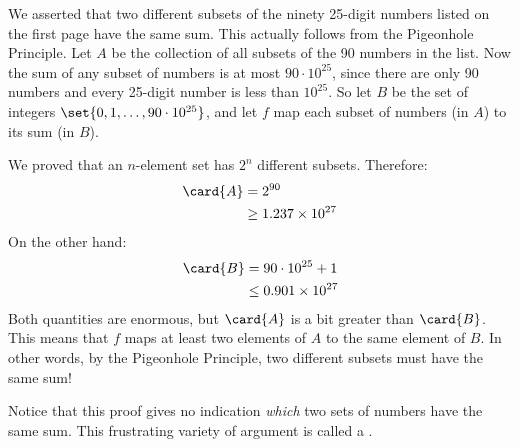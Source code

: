We asserted that two different subsets of the ninety 25-digit numbers
listed on the first page have the same sum.  This actually follows
from the Pigeonhole Principle.  Let $A$ be the collection of all
subsets of the 90 numbers in the list.  Now the sum of any subset of
numbers is at most $90 \cdot 10^{25}$, since there are only 90 numbers
and every 25-digit number is less than $10^{25}$.  So let $B$ be the
set of integers $\set{0, 1, \ldots, 90 \cdot 10^{25}}$, and let $f$
map each subset of numbers (in $A$) to its sum (in $B$).

We proved that an $n$-element set has $2^n$ different subsets.
Therefore:
%
\begin{align*}
\card{A}
    & = 2^{90} \\
    & \geq 1.237 \times 10^{27}
\end{align*}
%
On the other hand:
%
\begin{align*}
\card{B}
    & = 90 \cdot 10^{25} + 1 \\
    & \leq 0.901 \times 10^{27}
\end{align*}
%
Both quantities are enormous, but $\card{A}$ is a bit greater than
$\card{B}$.  This means that $f$ maps at least two elements of $A$ to
the same element of $B$.  In other words, by the Pigeonhole Principle,
two different subsets must have the same sum!

Notice that this proof gives no indication \emph{which} two sets of
numbers have the same sum.  This frustrating variety of argument is
called a .


\newcommand{\spa}{\spadesuit}
\newcommand{\hea}{\heartsuit}
\newcommand{\dia}{\diamondsuit}
\newcommand{\clu}{\clubsuit}

